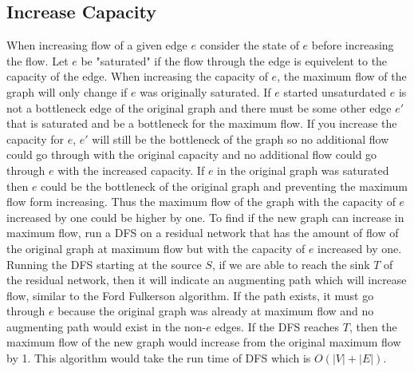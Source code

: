 \documentclass[11pt]{article}
\begin{document}
\subsection*{Increase Capacity}
When increasing flow of a given edge $e$ consider the state of $e$ before increasing the flow. Let $e$ be "saturated" if the flow through the edge is equivelent to the capacity of the edge. When increasing the capacity of $e$, the maximum flow of the graph will only change if $e$ was originally saturated. If $e$ started unsaturdated $e$ is not a bottleneck edge of the original graph and there must be some other edge $e'$ that is saturated and be a bottleneck for the maximum flow. If you increase the capacity for $e$, $e'$ will still be the bottleneck of the graph so no additional flow could go through with the original capacity and no additional flow could go through $e$ with the increased capacity. If $e$ in the original graph was saturated then $e$ could be the bottleneck of the original graph and preventing the maximum flow form increasing. Thus the maximum flow of the graph with the capacity of $e$ increased by one could be higher by one. To find if the new graph can increase in maximum flow, run a DFS on a residual network that has the amount of flow of the original graph at maximum flow but with the capacity of $e$ increased by one. Running the DFS starting at the source $S$, if we are able to reach the sink $T$ of the residual network, then it will indicate an augmenting path which will increase flow, similar to the Ford Fulkerson algorithm. If the path exists, it must go through $e$ because the original graph was already at maximum flow and no augmenting path would exist in the non-$e$ edges. If the DFS reaches $T$, then the maximum flow of the new graph would increase from the original maximum flow by 1. This algorithm would take the run time of DFS which is $O(|V|+|E|)$. 
\end{document}
